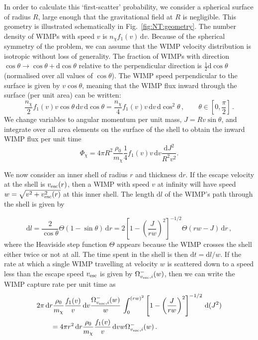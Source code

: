 In order to calculate this `first-scatter' probability, we consider a spherical surface of radius $R$, large enough that the gravitational field at $R$ is negligible. This geometry is illustrated schematically in Fig.~\ref{fig:NT:geometry}. The number density of WIMPs with speed $v$ is $n_\chi f_1(v) \,\mathrm{d}v$. Because of the spherical symmetry of the problem, we can assume that the WIMP velocity distribution is isotropic without loss of generality. The fraction of WIMPs with direction $\cos \theta \rightarrow \cos \theta + \textrm{d} \cos \theta$ relative to the perpendicular direction is $\frac{1}{2} \textrm{d}\cos\theta$ (normalised over all values of $\cos \theta$). The WIMP speed perpendicular to the surface is given by $v \cos\theta$, meaning that the WIMP flux inward through the surface (per unit area) can be written:
\begin{equation}
\frac{n_\chi}{2} f_1(v) v \cos\theta \,\textrm{d}v \,\textrm{d}\cos\theta = \frac{n_\chi}{4} f_1(v) v \,\textrm{d}v \,\textrm{d}\cos^2\theta \,, \qquad \theta \in [0, \frac{\pi}{2}]\,.
\end{equation}
We change variables to angular momentum per unit mass, $ J = R v \sin\theta $, and integrate over all area elements on the surface of the shell to obtain the inward WIMP flux per unit time
\begin{equation}
\Phi_\chi = 4 \pi R^2 \frac{\rho_0}{m_\chi} \frac{1}{4}f_1(v) v \, \textrm{d}v \frac{\textrm{d}J^2}{R^2 v^2}.
\end{equation}

We now consider an inner shell of radius $r$ and thickness $\mathrm{d}r$. If the escape velocity at the shell is $\vesc(r)$, then a WIMP with speed $v$ at infinity will have speed $w = \sqrt{v^2 + \vesc^2(r)}$ at this inner shell. The length $\mathrm{d}l$ of the WIMP's path through the shell is given by

\begin{equation}
\textrm{d}l = \frac{2}{\cos \theta} \Theta(1 - \sin\theta) \, \textrm{d}r = 2\left[ 1 - \left(\frac{J}{rw}\right)^2\right]^{-1/2} \Theta(rw - J) \, \textrm{d}r\,,
\end{equation}
where the Heaviside step function $\Theta$ appears because the WIMP crosses the shell either twice or not at all. The time spent in the shell is then $\mathrm{d}t = \mathrm{d}l/w$. If the rate at which a single WIMP travelling at velocity \(w\) is scattered down to a speed less than the escape speed \(\vesc\) is given by \(\Omega^{-}_{\vesc,i}(w)\), then we can write the WIMP capture rate per unit time as
\begin{align}
&2\pi \, \textrm{d}r \frac{\rho_0}{m_\chi}\frac{f_1(v)}{v}\,\textrm{d}v \frac{\ScatRate}{w}  \, \int_{0}^{(rw)^2} \left[ 1 - \left(\frac{J}{rw}\right)^2\right]^{-1/2} \, \textrm{d}(J^2) \nonumber\\&\qquad= 4 \pi r^2 \, \textrm{d}r \frac{\rho_0}{m_\chi} \frac{f_1(v)}{v}\, \textrm{d}v w \ScatRate\,.
\end{align}

